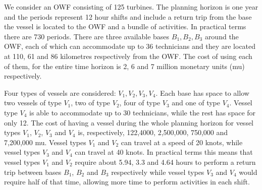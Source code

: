 We consider an OWF consisting of 125 turbines. The planning horizon is one year and the periods represent 12 hour shifts and include a return trip from the base the vessel is located to the OWF and a bundle of activities. In practical terms there are 730 periods. There are three available bases $B_1,B_2,B_3$ around the OWF, each of which can accommodate up to 36 technicians and they are located at 110, 61  and 86 kilometres respectively from the OWF. The cost of using each of them, for the entire time horizon is 2, 6 and 7 million monetary units (mu) respectively.

Four types of vessels are considered: $V_1,V_2,V_3,V_4$. Each base has space to allow two vessels of type $V_1$, two of type $V_2$, four of type $V_3$ and one of type $V_4$. Vessel type $V_4$ is able to accommodate up to 30 technicians, while the rest has space for only 12. The cost of having a vessel during the whole planning horizon for vessel types $V_1$, $V_2$, $V_3$ and $V_4$ is, respectively, 122,4000, 2,500,000, 750,000 and 7,200,000 mu. Vessel types $V_1$ and $V_2$ can travel at a speed of 20 knots, while vessel types $V_3$ and $V_4$ can travel at 40 knots. In practical terms this means that vessel types $V_1$ and $V_2$ require about 5.94, 3.3 and 4.64 hours to perform a return trip between bases $B_1$, $B_2$ and $B_3$ respectively while vessel types $V_3$ and $V_4$ would require half of that time, allowing more time to perform activities in each shift.

